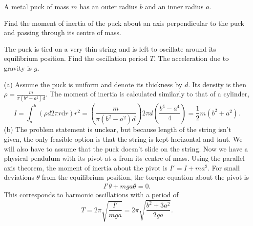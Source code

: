 \documentclass[../TST.tex]{subfiles}
\begin{document}
\begin{pproblem}
A metal puck of mass $m$ has an outer radius $b$ and an inner radius $a$.
\begin{subpart}
	\item Find the moment of inertia of the puck about an axis perpendicular to the puck and passing through its centre of mass. 
	\item The puck is tied on a very thin string and is left to oscillate around its equilibrium position. Find the oscillation period $T$. The acceleration due to gravity is $g$. 
\end{subpart}
\end{pproblem}

\ifprob \else
\begin{solution} (a) Assume the puck is uniform and denote its thickness by $d$. Its density is then $\rho=\frac{m}{\pi(b^2-a^2)d}$. The moment of inertia is calculated similarly to that of a cylinder,
	\begin{equation*}
		I=\int_a^b (\rho d 2\pi r \mathrm{d}r)r^2=\left(\frac{m}{\pi(b^2-a^2)d}\right)2\pi d \left( \frac{b^4-a^4}{4}\right)=\boxed{\frac{1}{2}m(b^2+a^2).}
	\end{equation*}
(b) The problem statement is unclear, but because length of the string isn't given, the only feasible option is that the string is kept horizontal and taut. We will also have to assume that the puck doesn't slide on the string. Now we have a physical pendulum with its pivot at $a$ from its centre of mass. Using the parallel axis theorem, the moment of inertia about the pivot is $I'=I+ma^2$. For small deviations $\theta$ from the equilibrium position, the torque equation about the pivot is 
\begin{equation*}
	I'\ddot{\theta}+mga\theta=0
.
\end{equation*}
This corresponds to harmonic oscillations with a period of 
\begin{equation*}
	T=2\pi\sqrt{\frac{I'}{mga}}=\boxed{2\pi\sqrt{\frac{b^2+3a^2}{2ga}}.}
\end{equation*}


\end{solution}
\fi
\end{document}
